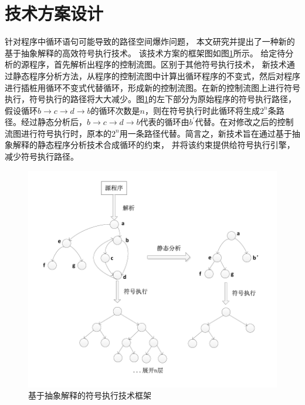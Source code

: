 \section{技术方案设计}
针对程序中循环语句可能导致的路径空间爆炸问题，
本文研究并提出了一种新的基于抽象解释的高效符号执行技术。
该技术方案的框架图如图\ref{fig-framework}所示。
给定待分析的源程序，首先解析出程序的控制流图。区别于其他符号执行技术，
新技术通过静态程序分析方法，从程序的控制流图中计算出循环程序的不变式，然后对程序进行插桩用循环不变式代替循环，形成新的控制流图。在新的控制流图上进行符号执行，符号执行的路径将大大减少。图\ref{fig-framework}的左下部分为原始程序的符号执行路径，假设循环$b \rightarrow c \rightarrow d \rightarrow b$的循环次数是$n$，则在符号执行时此循环将生成$2^{n}$条路径。经过静态分析后，$b \rightarrow c \rightarrow d \rightarrow b$代表的循环由$b^{'}$代替。在对修改之后的控制流图进行符号执行时，原本的$2^{n}$用一条路径代替。简言之，新技术旨在通过基于抽象解释的静态程序分析技术合成循环的约束，
并将该约束提供给符号执行引擎，减少符号执行路径。

\begin{figure}[h]
	\centering
	\includegraphics{figures/chap04/framework.pdf}
	\caption{基于抽象解释的符号执行技术框架}
	\label{fig-framework}
\end{figure}




